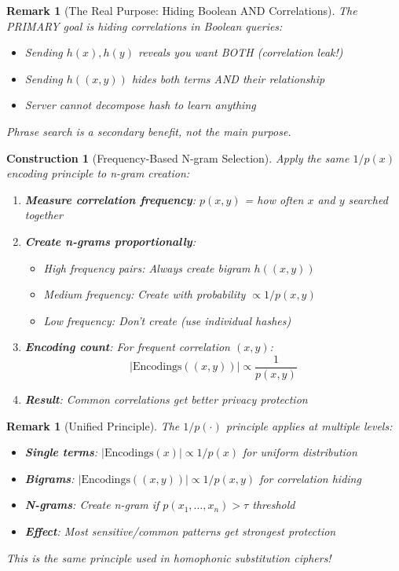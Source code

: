 \documentclass[11pt,final,hidelinks]{article}
\newtheorem{remark}[theorem]{Remark}
\newtheorem{construction}[theorem]{Construction}
\begin{document}
\begin{remark}[The Real Purpose: Hiding Boolean AND Correlations]
The PRIMARY goal is hiding correlations in Boolean queries:
\begin{itemize}
    \item Sending $h(x), h(y)$ reveals you want BOTH (correlation leak!)
    \item Sending $h((x,y))$ hides both terms AND their relationship
    \item Server cannot decompose hash to learn anything
\end{itemize}
Phrase search is a secondary benefit, not the main purpose.
\end{remark}

\begin{construction}[Frequency-Based N-gram Selection]
Apply the same $1/p(x)$ encoding principle to n-gram creation:
\begin{enumerate}
    \item \textbf{Measure correlation frequency}: $p(x,y)$ = how often $x$ and $y$ searched together
    \item \textbf{Create n-grams proportionally}: 
        \begin{itemize}
            \item High frequency pairs: Always create bigram $h((x,y))$
            \item Medium frequency: Create with probability $\propto 1/p(x,y)$
            \item Low frequency: Don't create (use individual hashes)
        \end{itemize}
    \item \textbf{Encoding count}: For frequent correlation $(x,y)$:
        \begin{equation}
        |\text{Encodings}((x,y))| \propto \frac{1}{p(x,y)}
        \end{equation}
    \item \textbf{Result}: Common correlations get better privacy protection
\end{enumerate}
\end{construction}

\begin{remark}[Unified Principle]
The $1/p(\cdot)$ principle applies at multiple levels:
\begin{itemize}
    \item \textbf{Single terms}: $|\text{Encodings}(x)| \propto 1/p(x)$ for uniform distribution
    \item \textbf{Bigrams}: $|\text{Encodings}((x,y))| \propto 1/p(x,y)$ for correlation hiding
    \item \textbf{N-grams}: Create n-gram if $p(x_1, \ldots, x_n) > \tau$ threshold
    \item \textbf{Effect}: Most sensitive/common patterns get strongest protection
\end{itemize}
This is the same principle used in homophonic substitution ciphers!
\end{remark}
\end{document}
